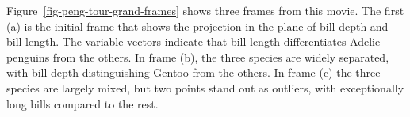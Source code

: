 \documentclass[
  letterpaper,
  10pt,
  krantz2]{krantz}
\begin{document}
{Figure~\ref{fig-peng-tour-grand-frames} shows three frames from this
movie. The first (a) is the initial frame that shows the projection in
the plane of bill depth and bill length. The variable vectors indicate
that bill length differentiates Adelie penguins from the others. In
frame (b), the three species are widely separated, with bill depth
distinguishing Gentoo from the others. In frame (c) the three species
are largely mixed, but two points stand out as outliers, with
exceptionally long bills compared to the rest.

\begin{figure}

\begin{minipage}{0.33\linewidth}



\end{minipage}%
%
\begin{minipage}{0.33\linewidth}

\centering{

}
\end{minipage}
\end{figure}}
\end{document}
